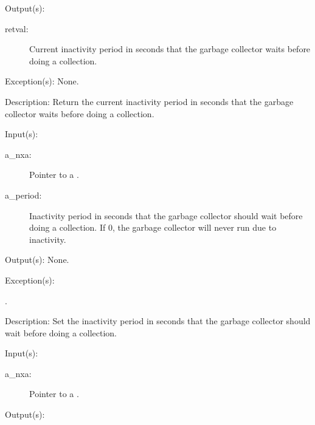 \begin{capi}
\begin{capilist}
	\item[Output(s): ]
		\begin{description}\item[]
		\item[retval: ]
			Current inactivity period in seconds that the garbage
			collector waits before doing a collection.
		\end{description}
	\item[Exception(s): ] None.
	\item[Description: ]
		Return the current inactivity period in seconds that the garbage
		collector waits before doing a collection.
	\end{capilist}
\label{nxa_period_set}
	\begin{capilist}
	\item[Input(s): ]
		\begin{description}\item[]
		\item[a\_nxa: ]
			Pointer to a .
		\item[a\_period: ]
			Inactivity period in seconds that the garbage collector
			should wait before doing a collection.  If 0, the
			garbage collector will never run due to inactivity.
		\end{description}
	\item[Output(s): ] None.
	\item[Exception(s): ]
		\begin{description}\item[]
		\item[.]
		\end{description}
	\item[Description: ]
		Set the inactivity period in seconds that the garbage collector
		should wait before doing a collection.
	\end{capilist}
\label{nxa_threshold_get}
	\begin{capilist}
	\item[Input(s): ]
		\begin{description}\item[]
		\item[a\_nxa: ]
			Pointer to a \classname{nxa}.
		\end{description}
	\item[Output(s): ]

\end{capilist}
\end{capi}
